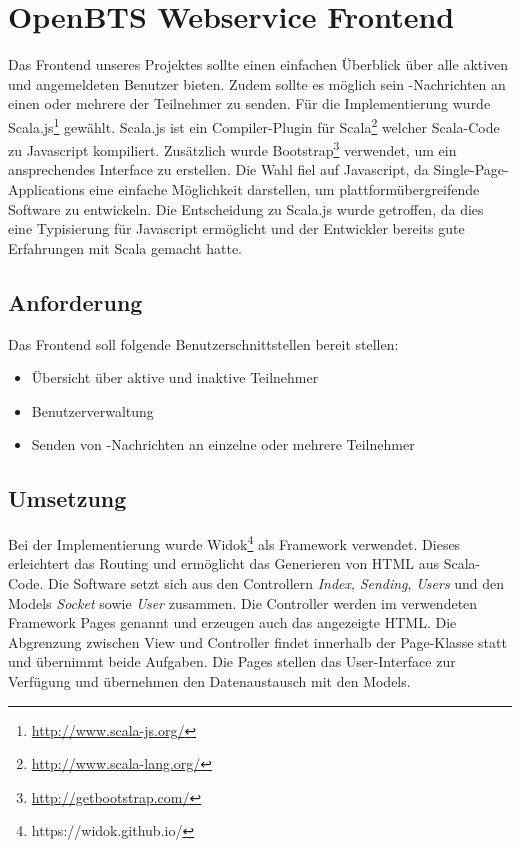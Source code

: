 \section{OpenBTS Webservice Frontend}
\label{sec:frontend}
Das Frontend unseres Projektes sollte einen einfachen Überblick über alle aktiven und angemeldeten Benutzer bieten. Zudem sollte es möglich sein \SMS-Nachrichten an einen oder mehrere der Teilnehmer zu senden. Für die Implementierung wurde Scala.js\footnote{\url{http://www.scala-js.org/}} gewählt. Scala.js ist ein Compiler-Plugin für Scala\footnote{\url{http://www.scala-lang.org/}} welcher Scala-Code zu Javascript kompiliert. Zusätzlich wurde Bootstrap\footnote{\url{http://getbootstrap.com/}} verwendet, um ein ansprechendes Interface zu erstellen.
Die Wahl fiel auf Javascript, da Single-Page-Applications eine einfache Möglichkeit darstellen, um plattformübergreifende Software zu entwickeln. Die Entscheidung zu Scala.js wurde getroffen, da dies eine Typisierung für Javascript ermöglicht und der Entwickler bereits gute Erfahrungen mit Scala gemacht hatte.

\subsection{Anforderung}
Das Frontend soll folgende Benutzerschnittstellen bereit stellen:
\begin{itemize}
	\item Übersicht über aktive und inaktive Teilnehmer
	\item Benutzerverwaltung
	\item Senden von \SMS-Nachrichten an einzelne oder mehrere Teilnehmer
\end{itemize}

\subsection{Umsetzung}
Bei der Implementierung wurde Widok\footnote{https://widok.github.io/} als Framework verwendet. Dieses erleichtert das Routing und ermöglicht das Generieren von HTML aus Scala-Code.
Die Software setzt sich aus den Controllern \emph{Index}, \emph{Sending}, \emph{Users} und den Models \emph{Socket} sowie \emph{User} zusammen. Die Controller werden im verwendeten Framework Pages genannt und erzeugen auch das angezeigte HTML. Die Abgrenzung zwischen View und Controller findet innerhalb der Page-Klasse statt und übernimmt beide Aufgaben. Die Pages stellen das User-Interface zur Verfügung und übernehmen den Datenaustausch mit den Models.

